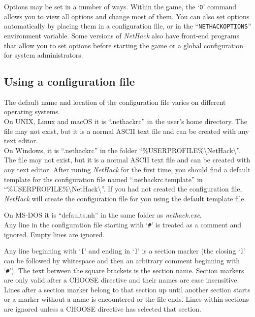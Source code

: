 Options may be set in a number of ways.  Within the game, the `{\tt O}'
command allows you to view all options and change most of them.
You can also set options automatically by placing them in a configuration
file, or in the ``{\tt NETHACKOPTIONS}'' environment variable.
Some versions of {\it NetHack\/} also have front-end programs that allow
you to set options before starting the game or a global configuration
for system administrators.

\subsection*{Using a configuration file}

The default name and location of the configuration file varies on different
operating systems.\\

On UNIX, Linux and macOS it is \mbox{``.nethackrc''} in the user's home
directory. The file may not exist, but it is a normal ASCII text file and
can be created with any text editor.\\

On Windows, it is \mbox{``.nethackrc''} in the folder
\mbox{{``\%USERPROFILE\%\textbackslash NetHack\textbackslash''}}. The
file may not exist, but it is a normal ASCII text file and can be created
with any text editor.
After runing {\it NetHack\/} for the first time, you should find a default
template for ths configuration file named \mbox{``.nethackrc.template''} in
\mbox{{``\%USERPROFILE\%\textbackslash NetHack\textbackslash''}}.
If you had not created the configuration file, {\it NetHack\/} will create
the configuration file for you using the default template file.

On MS-DOS it is \mbox{``defaults.nh''} in the same folder as
\mbox{{\it nethack.exe\/}}.\\

Any line in the configuration file starting with `{\tt \#}' is treated
as a comment and ignored.
Empty lines are ignored.

Any line beginning with `{\tt \verb+[+}' and ending in `{\tt \verb+]+}'
is a section marker (the closing `{\tt \verb+]+}' can be followed
by whitespace and then an arbitrary comment beginning with `{\tt \#}').
The text between the square brackets is the section name.
Section markers are only valid after a CHOOSE directive and their names
are case insensitive.
Lines after a section marker belong to that section up until another
section starts or a marker without a name is encountered or the file ends.
Lines within sections are ignored unless a CHOOSE directive has selected
that section.

